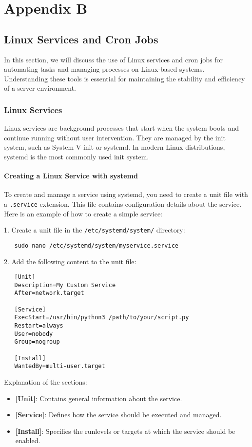 \chapter{Appendix B}
\section{Linux Services and Cron Jobs}
\label{sec:cron-jobs}

In this section, we will discuss the use of Linux services and cron jobs for automating tasks and managing processes on Linux-based systems. Understanding these tools is essential for maintaining the stability and efficiency of a server environment.

\subsection{Linux Services}
Linux services are background processes that start when the system boots and continue running without user intervention. They are managed by the init system, such as System V init or systemd. In modern Linux distributions, systemd is the most commonly used init system.

\subsubsection{Creating a Linux Service with systemd}
To create and manage a service using systemd, you need to create a unit file with a \texttt{.service} extension. This file contains configuration details about the service. Here is an example of how to create a simple service:

1. Create a unit file in the \texttt{/etc/systemd/system/} directory:
   \begin{verbatim}
   sudo nano /etc/systemd/system/myservice.service
   \end{verbatim}

2. Add the following content to the unit file:
   \begin{verbatim}
   [Unit]
   Description=My Custom Service
   After=network.target

   [Service]
   ExecStart=/usr/bin/python3 /path/to/your/script.py
   Restart=always
   User=nobody
   Group=nogroup

   [Install]
   WantedBy=multi-user.target
   \end{verbatim}

   Explanation of the sections:
   \begin{itemize}
       \item \textbf{[Unit]}: Contains general information about the service.
       \item \textbf{[Service]}: Defines how the service should be executed and managed.
       \item \textbf{[Install]}: Specifies the runlevels or targets at which the service should be enabled.
   \end{itemize}

